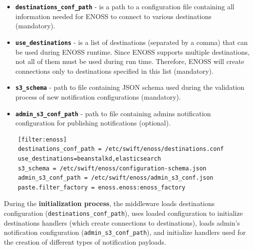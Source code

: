     \begin{itemize}
        \item \textbf{\texttt{destinations\_conf\_path}} - is a path to a configuration file containing all information needed for ENOSS to connect to various destinations (mandatory).
        \item \textbf{\texttt{use\_destinations}} - is a list of destinations (separated by a comma) that can be used during ENOSS runtime. Since ENOSS supports multiple destinations, not all of them must be used during run time. Therefore, ENOSS will create connections only to destinations specified in this list (mandatory).
        \item \textbf{\texttt{s3\_schema}} - path to file containing JSON schema used during the validation process of new notification configurations (mandatory).
        \item \textbf{\texttt{admin\_s3\_conf\_path}} - path to file containing admins notification configuration for publishing notifications (optional).
    \end{itemize}

    \lstset{
        caption=Example ENOSS middleware configuration stored in the Proxy server configuration (proxy-server.conf).,
        label=lst:middlewareConfig1
    }
    \begin{lstlisting}
    [filter:enoss]
    destinations_conf_path = /etc/swift/enoss/destinations.conf
    use_destinations=beanstalkd,elasticsearch
    s3_schema = /etc/swift/enoss/configuration-schema.json
    admin_s3_conf_path = /etc/swift/enoss/admin_s3_conf.json
    paste.filter_factory = enoss.enoss:enoss_factory
    \end{lstlisting}

    During the \textbf{initialization process}, the middleware loads destinations configuration (\texttt{destinations\_conf\_path}), uses loaded configuration to initialize destinations handlers (which create connections to destinations), loads admin's notification configuration (\texttt{admin\_s3\_conf\_path}), and initialize handlers used for the creation of different types of notification payloads.

